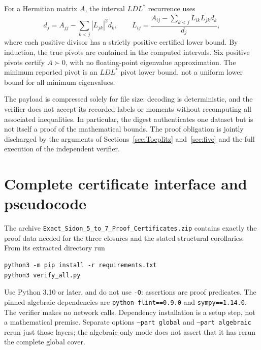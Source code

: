 \documentclass[11pt]{article}
\begin{document}
For a Hermitian matrix $A$, the interval $LDL^*$ recurrence uses
\[
 d_j=A_{jj}-\sum_{k<j}|L_{jk}|^2d_k,\qquad
 L_{ij}=\frac{A_{ij}-\sum_{k<j}L_{ik}\overline{L_{jk}}d_k}{d_j},
\]
where each positive divisor has a strictly positive certified lower bound. By induction, the true pivots are contained in the computed intervals. Six positive pivots certify $A\succ0$, with no floating-point eigenvalue approximation. The minimum reported pivot is an $LDL^*$ pivot lower bound, not a uniform lower bound for all minimum eigenvalues.

The payload is compressed solely for file size: decoding is deterministic, and the verifier does not accept its recorded labels or moments without recomputing all associated inequalities. In particular, the digest authenticates one dataset but is not itself a proof of the mathematical bounds. The proof obligation is jointly discharged by the arguments of Sections~\ref{sec:Toeplitz} and~\ref{sec:five} and the full execution of the independent verifier.




\section{Complete certificate interface and pseudocode}\label{app:driver}
The archive \texttt{Exact\_Sidon\_5\_to\_7\_Proof\_Certificates.zip}
contains exactly the proof data needed for the three closures and the
stated structural corollaries. From its extracted directory run
\begin{verbatim}
python3 -m pip install -r requirements.txt
python3 verify_all.py
\end{verbatim}
Use Python 3.10 or later, and do not use \texttt{-O}: assertions are
proof predicates. The pinned algebraic dependencies are
\texttt{python-flint==0.9.0} and \texttt{sympy==1.14.0}.
The verifier makes no network calls. Dependency installation is a setup
step, not a mathematical premise. Separate options
\texttt{--part global} and \texttt{--part algebraic} rerun just those
layers; the algebraic-only mode does not assert that it has rerun the
complete global cover.
\end{document}
